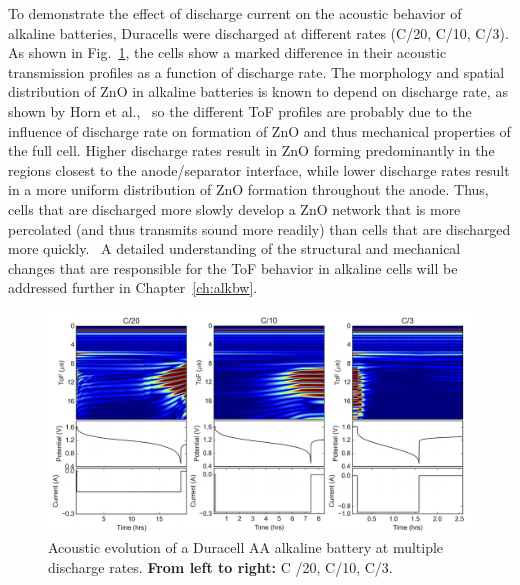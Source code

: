 To demonstrate the effect of discharge current on the acoustic behavior of alkaline batteries, Duracells were discharged at different rates (C/20, C/10, C/3). As shown in Fig.~\ref{fig:bwratecomp}, the cells show a marked difference in their acoustic transmission profiles as a function of discharge rate. The morphology and spatial distribution of ZnO in alkaline batteries is known to depend on discharge rate, as shown by Horn et al.,~\cite{horn} so the different ToF profiles are probably due to the influence of discharge rate on formation of ZnO and thus mechanical properties of the full cell. Higher discharge rates result in ZnO forming predominantly in the regions closest to the anode/separator interface, while lower discharge rates result in a more uniform distribution of ZnO formation throughout the anode. Thus, cells that are discharged more slowly develop a ZnO network that is more percolated (and thus transmits sound more readily) than cells that are discharged more quickly.~\cite{Bhadra2015-aq} A detailed understanding of the structural and mechanical changes that are responsible for the ToF behavior in alkaline cells will be addressed further in Chapter~\ref{ch:alkbw}.

\begin{figure}[htb]
  \centering
    \includegraphics[width=\textwidth]{ch4-bw/images/ratecomp.png}
    \caption[Acoustic evolution of a Duracell AA alkaline battery at multiple discharge rates.]{Acoustic evolution of a Duracell AA alkaline battery at multiple discharge rates. \textbf{From left to right:}  C /20, C/10, C/3.}
    \label{fig:bwratecomp}
\end{figure}




